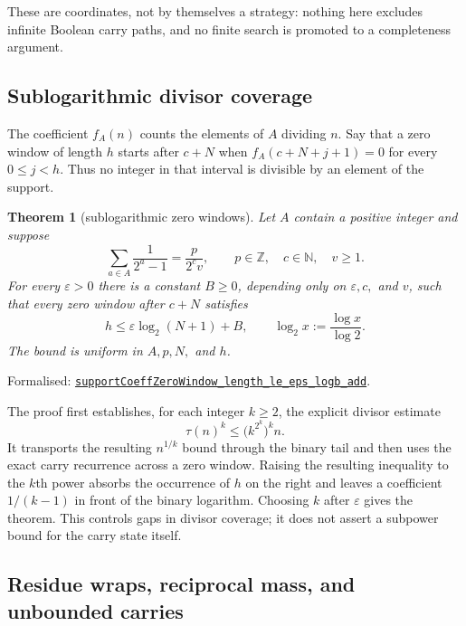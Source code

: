 \documentclass[11pt]{article}
\newcommand{\commit}{81150c1c6fdd4cd51e76d3aa0de344341e0e9e7c}
\newcommand{\repobase}{https://github.com/wcook04/plectis-lean-erdos249-257/blob/\commit}
\newcommand{\PK}{Erdos249257}
\newcommand{\lref}[3]{\href{\repobase/\PK/#1\#L#2}{\nolinkurl{#3}}}
\newtheorem{theorem}{Theorem}[section]
\theoremstyle{definition}
\theoremstyle{remark}
\newcommand{\N}{\mathbb{N}}
\newcommand{\Z}{\mathbb{Z}}
\begin{document}
These are coordinates, not by themselves a strategy: nothing here excludes
infinite Boolean carry paths, and no finite search is promoted to a
completeness argument.

\subsection{Sublogarithmic divisor coverage}

The coefficient $f_A(n)$ counts the elements of $A$ dividing $n$. Say that a
zero window of length $h$ starts after $c+N$ when
$f_A(c+N+j+1)=0$ for every $0\le j<h$. Thus no integer in that interval is
divisible by an element of the support.

\begin{theorem}[sublogarithmic zero windows]\label{res:sublog}
Let $A$ contain a positive integer and suppose
\[
  \sum_{a\in A}\frac1{2^a-1}=\frac{p}{2^c v},
  \qquad p\in\Z,\quad c\in\N,\quad v\ge1.
\]
For every $\varepsilon>0$ there is a constant $B\ge0$, depending only on
$\varepsilon,c,$ and $v$, such that every zero window after $c+N$ satisfies
\[
  h\le \varepsilon\log_2(N+1)+B,
  \qquad \log_2 x:=\frac{\log x}{\log 2}.
\]
The bound is uniform in $A,p,N,$ and $h$.
\end{theorem}
\noindent Formalised:
\lref{SublogDivisorCoverage.lean}{392}{supportCoeffZeroWindow_length_le_eps_logb_add}.

The proof first establishes, for each integer $k\ge2$, the explicit divisor
estimate
\[
  \tau(n)^k\le \bigl(k^{2^k}\bigr)^k n.
\]
It transports the resulting $n^{1/k}$ bound through the binary tail and then
uses the exact carry recurrence across a zero window. Raising the resulting
inequality to the $k$th power absorbs the occurrence of $h$ on the right and
leaves a coefficient $1/(k-1)$ in front of the binary logarithm. Choosing $k$
after $\varepsilon$ gives the theorem. This controls gaps in divisor coverage;
it does not assert a subpower bound for the carry state itself.

\subsection{Residue wraps, reciprocal mass, and unbounded carries}
\end{document}
